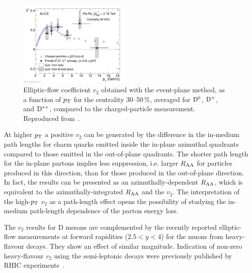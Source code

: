 \begin{figure}
\centering
\includegraphics[width=0.5\textwidth]{ksfigures/DmesonV2.pdf}
\caption{Elliptic-flow coefficient $v_2$ obtained with the event-plane method, as a function of $p_{\rm T}$ for the centrality 30--50\,\%, averaged for ${\rm D}^0$, ${\rm D}^+$, and ${\rm D}^{*+}$, compared to the charged-particle measurement. Reproduced from~\cite{}.}
\label{figks:DmesonV2}
\end{figure}

At higher $p_{\rm T}$ a positive $v_2$ can be generated by the difference in the in-medium path lengths for charm quarks emitted inside the in-plane azimuthal quadrants compared to those emitted in the out-of-plane quadrants. The shorter path length for the in-plane partons implies less suppression, i.e. larger $R_{\rm AA}$ for particles produced in this direction, than for those produced in the out-of-plane direction. In fact, the results can be presented as an azimuthally-dependent $R_{\rm AA}$, which is equivalent to the azimuthally-integrated $R_{\rm AA}$ and the $v_2$. The interpretation of the high-$p_{\rm T}$ $v_2$ as a path-length effect opens the possibility of studying  the in-medium path-length dependence of the parton energy loss. 

The $v_2$ results for D mesons are complemented by the recently reported elliptic-flow measurements at forward rapidities ($2.5 < y < 4$) for the muons from heavy-flavour decays. They show an effect of similar magnitude. Indication of non-zero heavy-flavour $v_2$ using the semi-leptonic decays were previously published by RHIC experiments~\cite{}.
